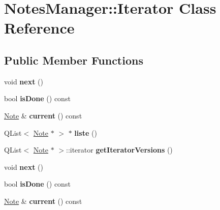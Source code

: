 \hypertarget{class_notes_manager_1_1_iterator}{}\section{Notes\+Manager\+:\+:Iterator Class Reference}
\label{class_notes_manager_1_1_iterator}
\subsection*{Public Member Functions}
\begin{DoxyCompactItemize}
\item 
\mbox{\label{class_notes_manager_1_1_iterator_a1a79699fe56e691c3f1c72eb46703fc6}} 
void {\bfseries next} ()
\item 
\mbox{\label{class_notes_manager_1_1_iterator_ab9afd283687410c5591f97881ac17b29}} 
bool {\bfseries is\+Done} () const
\item 
\mbox{\label{class_notes_manager_1_1_iterator_aaf695d1b7faf4afa9a36115f5e9d3547}} 
\hyperlink{class_note}{Note} \& {\bfseries current} () const
\item 
\mbox{\label{class_notes_manager_1_1_iterator_ab64667e5cf5e2285761c6eaa12797a83}} 
Q\+List$<$ \hyperlink{class_note}{Note} $\ast$ $>$ $\ast$ {\bfseries liste} ()
\item 
\mbox{\label{class_notes_manager_1_1_iterator_ab0cfae90dcf5788e37f4bf84f5c58093}} 
Q\+List$<$ \hyperlink{class_note}{Note} $\ast$ $>$\+::iterator {\bfseries get\+Iterator\+Versions} ()
\item 
\mbox{\label{class_notes_manager_1_1_iterator_a1a79699fe56e691c3f1c72eb46703fc6}} 
void {\bfseries next} ()
\item 
\mbox{\label{class_notes_manager_1_1_iterator_ab9afd283687410c5591f97881ac17b29}} 
bool {\bfseries is\+Done} () const
\item 
\mbox{\label{class_notes_manager_1_1_iterator_aaf695d1b7faf4afa9a36115f5e9d3547}} 
\hyperlink{class_note}{Note} \& {\bfseries current} () const
\end{DoxyCompactItemize}
